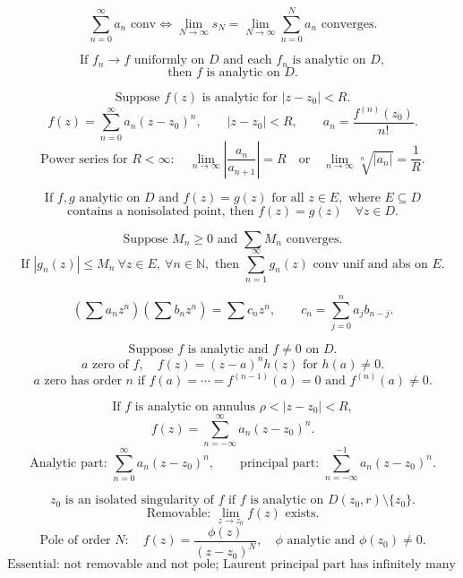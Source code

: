 \documentclass[11pt]{article}
\begin{document}
\newpage


\[
\sum_{n=0}^{\infty}a_n\text{ conv}
\Longleftrightarrow
\lim_{N\to\infty}s_N=\lim_{N\to\infty}\sum_{n=0}^{N}a_n
\text{ converges.}
\]

\[
\text{If }f_n\to f\text{ uniformly on }D
\text{ and each }f_n\text{ is analytic on }D,
\]
\[
\text{then }f\text{ is analytic on }D.
\]

\[
\text{Suppose }f(z)\text{ is analytic for }|z-z_0|<R.
\]
\[
f(z)=\sum_{n=0}^{\infty}a_n(z-z_0)^n,\qquad
|z-z_0|<R,\qquad
a_n=\frac{f^{(n)}(z_0)}{n!}.
\]
\[
\text{Power series for }R<\infty:
\quad
\lim_{n\to\infty}\left|\frac{a_n}{a_{n+1}}\right|=R
\quad\text{or}\quad
\lim_{n\to\infty}\sqrt[n]{|a_n|}=\frac1R.
\]

\[
\text{If }f,g\text{ analytic on }D\text{ and }f(z)=g(z)
\text{ for all }z\in E,\text{ where }E\subseteq D
\]
\[
\text{contains a nonisolated point, then }f(z)=g(z)\quad \forall z\in D.
\]

\[
\text{Suppose }M_n\ge0\text{ and }\sum M_n\text{ converges.}
\]
\[
\text{If }|g_n(z)|\le M_n\ \forall z\in E,\ \forall n\in\mathbb N,
\text{ then }\sum_{n=1}^{\infty}g_n(z)
\text{ conv unif and abs on }E.
\]

\[
\left(\sum a_nz^n\right)\left(\sum b_nz^n\right)
=
\sum c_nz^n,\qquad
c_n=\sum_{j=0}^n a_jb_{n-j}.
\]


\[
\text{Suppose }f\text{ is analytic and }f\ne0\text{ on }D.
\]
\[
a\text{ zero of }f,\quad f(z)=(z-a)^nh(z)
\text{ for }h(a)\ne0.
\]
\[
a\text{ zero has order }n\text{ if }f(a)=\cdots=f^{(n-1)}(a)=0
\text{ and }f^{(n)}(a)\ne0.
\]

\[
\text{If }f\text{ is analytic on annulus }\rho<|z-z_0|<R,
\]
\[
f(z)=\sum_{n=-\infty}^{\infty}a_n(z-z_0)^n.
\]
\[
\text{Analytic part: }\sum_{n=0}^{\infty}a_n(z-z_0)^n,\qquad
\text{principal part: }\sum_{n=-\infty}^{-1}a_n(z-z_0)^n.
\]

\[
z_0\text{ is an isolated singularity of }f
\text{ if }f\text{ is analytic on }D(z_0,r)\setminus\{z_0\}.
\]
\[
\text{Removable: }\lim_{z\to z_0}f(z)\text{ exists.}
\]
\[
\text{Pole of order }N:\quad f(z)=\frac{\phi(z)}{(z-z_0)^N},
\quad \phi\text{ analytic and }\phi(z_0)\ne0.
\]
\[
\text{Essential: not removable and not pole; Laurent principal part has infinitely many terms.}
\]
\end{document}
